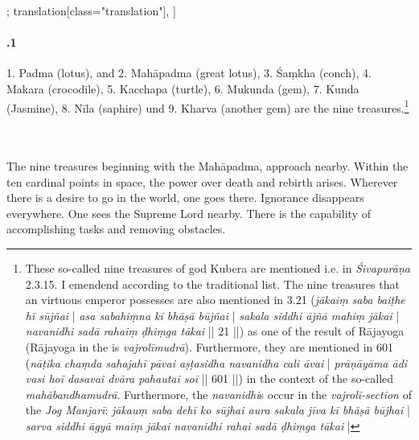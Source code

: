 \begin{alignment}[
  texts=edition[class="edition"];
  translation[class="translation"],
  ]
\begin{translation}
\begin{tlate}[42_1]
      \paragraph{.1 } 1. Padma (lotus), and 2. Mahāpadma (great lotus), 3. Śaṃkha (conch), 4. Makara (crocodile), 5. Kacchapa (turtle), 6. Mukunda (gem), 7. Kunda (Jasmine), 8. Nīla (saphire) und 9. Kharva (another gem) are the nine treasures.\footnote{These so-called nine treasures of god Kubera are mentioned i.e. in \textit{Śivapurāṇa} 2.3.15. I emendend according to the traditional list. The nine treasures that an virtuous emperor possesses are also mentioned in  3.21 (\textit{jākaiṃ saba baiṭhe hī sūjñai} | \textit{asa sabahiṃna kī bhāṣā būjñai} | \textit{sakala siddhi ājñā mahiṃ jākai} | \textit{navanidhi sadā rahaiṃ ḍhiṃga tākai} || 21 ||) as one of the result of Rājayoga (Rājayoga in the  is \textit{vajrolīmudrā}). Furthermore, they are mentioned in  601 (\textit{nāṭika chaṃda sahajahī pāvai aṣṭasidha navanidha cali āvai} | \textit{prāṇāyāma ādi vasi hoī dasavai dvāra pahautai soī} || 601 ||) in the context of the so-called \textit{mahābandhamudrā}. Furthermore, the \textit{navanidhi}s occur in the \textit{vajrolī-section} of the \textit{Jog Manjarī}: \textit{jākauṃ saba dehī ko sūjhai aura sakala jīva kī bhāṣā būjhai} | \textit{sarva siddhi āgyā maiṃ jākai navanidhi rahai sadā ḍhiṃga tākai} |}
    \end{tlate}
    \begin{tlate}[p42_03]
     \\\\ \indent The nine treasures beginning with the Mahāpadma, approach nearby. Within the ten cardinal points in space, the power over death and rebirth arises. Wherever there is a desire to go in the world, one goes there. Ignorance disappears everywhere. One sees the Supreme Lord nearby. There is the capability of accomplishing tasks and removing obstacles.
      \flushpage
    \end{tlate}
  \end{translation}
\end{alignment}
\pagebreak %
